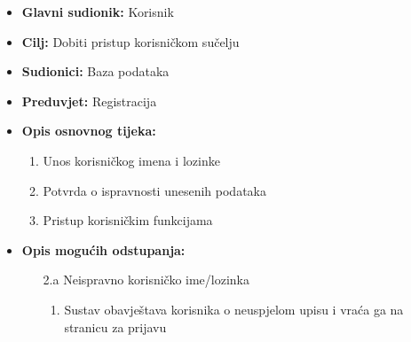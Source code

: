                        \noindent {}
					\begin{itemize}
	
						\item \textbf{Glavni sudionik: }Korisnik
						\item  \textbf{Cilj:} Dobiti pristup korisničkom sučelju
						\item  \textbf{Sudionici:} Baza podataka
						\item  \textbf{Preduvjet:} Registracija
						\item  \textbf{Opis osnovnog tijeka:}
						
						\item[] \begin{enumerate}
							\item Unos korisničkog imena i lozinke
                                \item Potvrda o ispravnosti unesenih podataka
                                \item Pristup korisničkim funkcijama
						\end{enumerate}

                            \item  \textbf{Opis mogućih odstupanja:}
						
						\item[] \begin{enumerate}
	
							\item[2.a] Neispravno korisničko ime/lozinka
							\item[] \begin{enumerate}
								
								\item Sustav obavještava korisnika o neuspjelom upisu i vraća ga na stranicu za prijavu\\
								
							\end{enumerate}
			
							
						\end{enumerate}
						
					\end{itemize}

